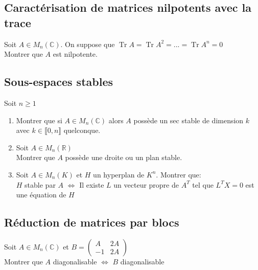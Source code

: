 \documentclass[10pt,a4paper]{article}
\theoremstyle{definition}
\DeclareMathOperator{\Tr}{Tr}
\begin{document}
\subsection{Caractérisation de matrices nilpotents avec la trace}
\noindent Soit $A \in M_n(\mathbb{C})$. On suppose que $\Tr A = \Tr A^2 = ... = \Tr A^n = 0$ \\
Montrer que $A$ est nilpotente.

\subsection{Sous-espaces stables}
\noindent Soit $n \geq 1$
\begin{enumerate}
\item Montrer que si $A \in M_n(\mathbb{C})$ alors $A$ possède un sec stable de dimension $k$ avec $k \in \llbracket 0, n \rrbracket$ quelconque.
\item Soit $A \in M_n(\mathbb{R})$ \\
Montrer que $A$ possède une droite ou un plan stable.
\item Soit $A \in M_n(K)$ et $H$ un hyperplan de $K^n$. Montrer que: \\
$H$ stable par $A$ $\iff$ Il existe $L$ un vecteur propre de $A^T$ tel que $L^T X = 0$ est une équation de $H$
\end{enumerate}

\subsection{Réduction de matrices par blocs}
\noindent Soit $A \in M_n(\mathbb{C})$ et $B = \begin{pmatrix}
A & 2A \\
-1 & 2A
\end{pmatrix}$ \\
Montrer que $A$ diagonalisable $\iff$ $B$ diagonalisable
\end{document}
